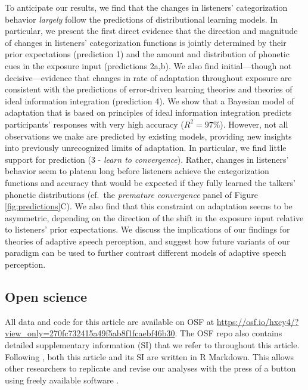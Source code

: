 \documentclass[
  11pt,
  man,mask,floatsintext]{apa6}
\begin{document}
To anticipate our results, we find that the changes in listeners' categorization behavior \emph{largely} follow the predictions of distributional learning models. In particular, we present the first direct evidence that the direction and magnitude of changes in listeners' categorization functions is jointly determined by their prior expectations (prediction 1) and the amount and distribution of phonetic cues in the exposure input (predictions 2a,b). We also find initial---though not decisive---evidence that changes in rate of adaptation throughout exposure are consistent with the predictions of error-driven learning theories and theories of ideal information integration (prediction 4). We show that a Bayesian model of adaptation that is based on principles of ideal information integration \autocites[the ideal adaptor,][]{kleinschmidt-jaeger2015,kleinschmidt-jaeger2016} predicts participants' responses with very high accuracy (\(R^2 = 97\%\)). However, not all observations we make are predicted by existing models, providing new insights into previously unrecognized limits of adaptation. In particular, we find little support for prediction (3 - \emph{learn to convergence}). Rather, changes in listeners' behavior seem to plateau long before listeners achieve the categorization functions and accuracy that would be expected if they fully learned the talkers' phonetic distributions (cf.~the \emph{premature convergence} panel of Figure \ref{fig:predictions}C). We also find that this constraint on adaptation seems to be asymmetric, depending on the direction of the shift in the exposure input relative to listeners' prior expectations. We discuss the implications of our findings for theories of adaptive speech perception, and suggest how future variants of our paradigm can be used to further contrast different models of adaptive speech perception.

\subsection{Open science}\label{open-science}

All data and code for this article are available on OSF at \url{https://osf.io/hxcy4/?view_only=270fc732415a49f5ab8f1fcaebf46b30}. The OSF repo also contains detailed supplementary information (SI) that we refer to throughout this article. Following \textcite{xie2023}, both this article and its SI are written in R Markdown. This allows other researchers to replicate and revise our analyses with the press of a button using freely available software \autocites[R,][]{R-base}[see also SI, \ref{sec:software}]{RStudio}.
\end{document}
